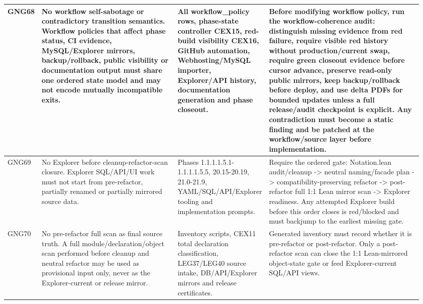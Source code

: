 \begin{longtable}{L{0.045\linewidth} L{0.345\linewidth} L{0.185\linewidth} L{0.39\linewidth}}
\hline
\addlinespace[0.24em]
GNG68 & No workflow self-sabotage or contradictory transition semantics. Workflow policies that affect phase status, CI evidence, MySQL/\allowbreak{}Explorer mirrors, backup/\allowbreak{}rollback, public visibility or documentation output must share one ordered state model and may not encode mutually incompatible exits. & All workflow\_policy rows, phase-state controller CEX15, red-build visibility CEX16, GitHub automation, Webhosting/\allowbreak{}MySQL importer, Explorer/\allowbreak{}API history, documentation generation and phase closeout. & Before modifying workflow policy, run the workflow-coherence audit: distinguish missing evidence from red failure, require visible red history without production/\allowbreak{}current swap, require green closeout evidence before cursor advance, preserve read-only public mirrors, keep backup/\allowbreak{}rollback before deploy, and use delta PDFs for bounded updates unless a full release/\allowbreak{}audit checkpoint is explicit. Any contradiction must become a static finding and be patched at the workflow/\allowbreak{}source layer before implementation.\\
\hline
\addlinespace[0.24em]
GNG69 & No Explorer before cleanup-refactor-scan closure. Explorer SQL/\allowbreak{}API/\allowbreak{}UI work must not start from pre-refactor, partially renamed or partially mirrored source data. & Phases 1.1.1.1.5.1-1.1.1.1.5.5, 20.15-20.19, 21.0-21.9, YAML/\allowbreak{}SQL/\allowbreak{}API/\allowbreak{}Explorer tooling and implementation prompts. & Require the ordered gate: Notation.lean audit/\allowbreak{}cleanup -> neutral naming/\allowbreak{}facade plan -> compatibility-preserving refactor -> post-refactor full 1:1 Lean mirror scan -> Explorer readiness. Any attempted Explorer build before this order closes is red/\allowbreak{}blocked and must backjump to the earliest missing gate.\\
\hline
\addlinespace[0.24em]
GNG70 & No pre-refactor full scan as final source truth. A full module/\allowbreak{}declaration/\allowbreak{}object scan performed before cleanup and neutral refactor may be used as provisional input only, never as the Explorer-current or release mirror. & Inventory scripts, CEX11 total declaration classification, LEG37/\allowbreak{}LEG40 source intake, DB/\allowbreak{}API/\allowbreak{}Explorer mirrors and release certificates. & Generated inventory must record whether it is pre-refactor or post-refactor. Only a post-refactor scan can close the 1:1 Lean-mirrored object-state gate or feed Explorer-current SQL/\allowbreak{}API views.\\

\end{longtable}
